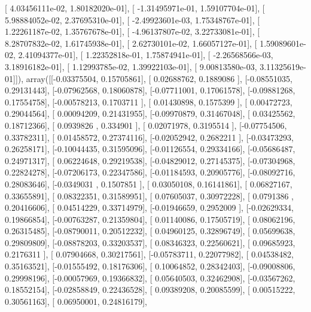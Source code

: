 \documentclass{article}
\begin{document}
       [  4.03456111e-02,   1.80182020e-01],
       [ -1.31495971e-01,   1.59107704e-01],
       [  5.98884052e-02,   2.37695310e-01],
       [ -2.49923601e-03,   1.75348767e-01],
       [  1.22261187e-02,   1.35767678e-01],
       [ -4.96137807e-02,   3.22733081e-01],
       [  8.28707832e-02,   1.61745938e-01],
       [  2.62730101e-02,   1.66057127e-01],
       [  1.59089601e-02,   2.41094377e-01],
       [  1.22352818e-01,   1.75874941e-01],
       [ -2.26568566e-03,   3.18916182e-01],
       [  1.12993785e-02,   1.39922103e-01],
       [  9.00813580e-03,   3.11325619e-01]]), array([[-0.03375504,  0.15705861],
       [ 0.02688762,  0.1889086 ],
       [-0.08551035,  0.29131443],
       [-0.07962568,  0.18060878],
       [-0.07711001,  0.17061578],
       [-0.09881268,  0.17554758],
       [-0.00578213,  0.1703711 ],
       [ 0.01430898,  0.1575399 ],
       [ 0.00472723,  0.29044564],
       [ 0.00094209,  0.21431955],
       [-0.09970879,  0.31467048],
       [ 0.03425562,  0.18712366],
       [ 0.0939826 ,  0.334901  ],
       [ 0.02071978,  0.3195514 ],
       [-0.07754506,  0.33782311],
       [ 0.01458572,  0.27374116],
       [-0.02052942,  0.2682211 ],
       [-0.03473293,  0.26258171],
       [-0.10044435,  0.31595096],
       [-0.01126554,  0.29334166],
       [-0.05686487,  0.24971317],
       [ 0.06224648,  0.29219538],
       [-0.04829012,  0.27145375],
       [-0.07304968,  0.22824278],
       [-0.07206173,  0.22347586],
       [-0.01184593,  0.20905776],
       [-0.08092716,  0.28083646],
       [-0.0349031 ,  0.1507851 ],
       [ 0.03050108,  0.16141861],
       [ 0.06827167,  0.33655891],
       [ 0.08322351,  0.31589951],
       [ 0.07605037,  0.30972228],
       [ 0.0791386 ,  0.20416606],
       [ 0.04514229,  0.33714979],
       [-0.01946659,  0.2952009 ],
       [-0.02629334,  0.19866854],
       [-0.00763287,  0.21359804],
       [ 0.01140086,  0.17505719],
       [ 0.08062196,  0.26315485],
       [-0.08790011,  0.20512232],
       [ 0.04960125,  0.32896749],
       [ 0.05699638,  0.29809809],
       [-0.08878203,  0.33203537],
       [ 0.08346323,  0.22560621],
       [ 0.09685923,  0.2176311 ],
       [ 0.07904668,  0.30217561],
       [-0.05783711,  0.22077982],
       [ 0.04538482,  0.35163521],
       [-0.01555492,  0.18176306],
       [ 0.10064852,  0.28342403],
       [-0.09008806,  0.29998196],
       [-0.00057969,  0.19366832],
       [ 0.05640503,  0.32462908],
       [-0.03567262,  0.18552154],
       [-0.02858849,  0.22436528],
       [ 0.09389208,  0.20085599],
       [ 0.00515222,  0.30561163],
       [ 0.06950001,  0.24816179],
\end{document}
